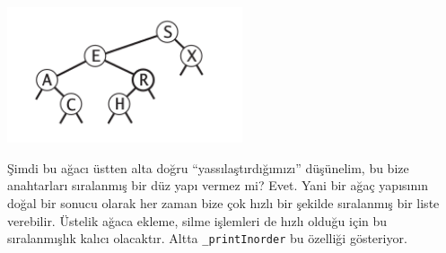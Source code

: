 \documentclass[12pt,fleqn]{article}\usepackage{../../common}
\begin{document}
\includegraphics[height=4cm]{basic_07.png}

Şimdi bu ağacı üstten alta doğru ``yassılaştırdığımızı'' düşünelim, bu bize
anahtarları sıralanmış bir düz yapı vermez mi? Evet. Yani bir ağaç
yapısının doğal bir sonucu olarak her zaman bize çok hızlı bir şekilde
sıralanmış bir liste verebilir. Üstelik ağaca ekleme, silme işlemleri de
hızlı olduğu için bu sıralanmışlık kalıcı olacaktır. Altta
\verb!_printInorder! bu özelliği gösteriyor. 
\end{document}
